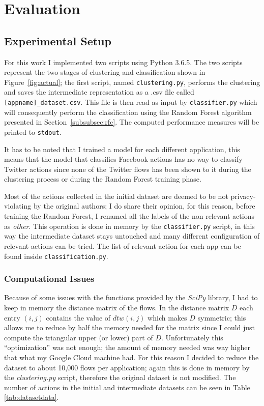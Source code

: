 \section{Evaluation}
\label{sec:eval}
\subsection{Experimental Setup}
\label{subsec:expsetup}
For this work I implemented two scripts using Python 3.6.5. The two scripts represent the two stages of clustering and classification shown in Figure~\ref{fig:actual}; the first script, named \texttt{clustering.py}, performs the clustering and saves the intermediate representation as a .csv file called \texttt{[appname]\_dataset.csv}. This file is then read as input by \texttt{classifier.py} which will consequently perform the classification using the Random Forest algorithm presented in Section~\ref{subsubsec:rfc}. The computed performance measures will be printed to \texttt{stdout}.

It has to be noted that I trained a model for each different application, this means that the model that classifies Facebook actions has no way to classify Twitter actions since none of the Twitter flows has been shown to it during the clustering process or during the Random Forest training phase.

Most of the actions collected in the initial dataset are deemed to be not privacy-violating by the original authors; I do share their opinion, for this reason, before training the Random Forest, I renamed all the labels of the non relevant actions as \textit{other}. This operation is done in memory by the \texttt{classifier.py} script, in this way the intermediate dataset stays untouched and many different configuration of relevant actions can be tried. The list of relevant action for each app can be found inside \texttt{classification.py}.


\subsubsection{Computational Issues}
Because of some issues with the functions provided by the \textit{SciPy} library, I had to keep in memory the distance matrix of the flows. In the distance matrix $D$ each entry $(i,j)$ contains the value of $dtw(i, j)$ which makes $D$ symmetric; this allows me to reduce by half the memory needed for the matrix since I could just compute the triangular upper (or lower) part of $D$. Unfortunately this ``optimization'' was not enough; the amount of memory needed was way higher that what my Google Cloud machine had. For this reason I decided to reduce the dataset to about 10,000 flows per application; again this is done in memory by the \textit{clustering.py} script, therefore the original dataset is not modified. The number of actions in the initial and intermediate datasets can be seen in Table \ref{tab:datasetdata}.

